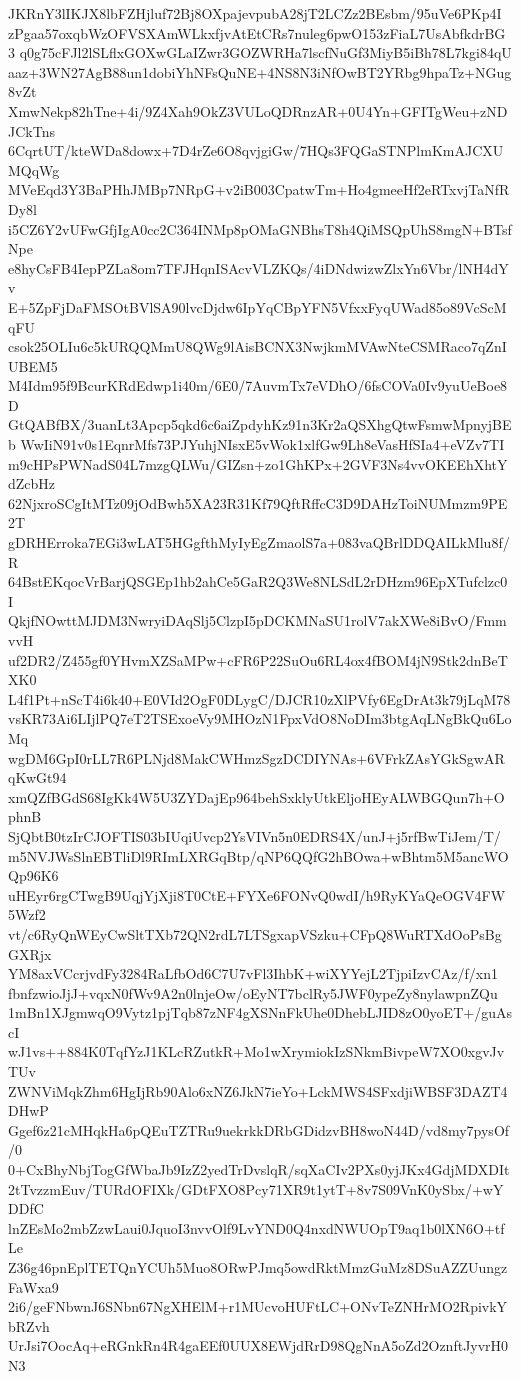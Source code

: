 JKRnY3lIKJX8lbFZHjluf72Bj8OXpajevpubA28jT2LCZz2BEsbm/95uVe6PKp4I
zPgaa57oxqbWzOFVSXAmWLkxfjvAtEtCRs7nuleg6pwO153zFiaL7UsAbfkdrBG3
q0g75cFJl2lSLflxGOXwGLaIZwr3GOZWRHa7lscfNuGf3MiyB5iBh78L7kgi84qU
aaz+3WN27AgB88un1dobiYhNFsQuNE+4NS8N3iNfOwBT2YRbg9hpaTz+NGug8vZt
XmwNekp82hTne+4i/9Z4Xah9OkZ3VULoQDRnzAR+0U4Yn+GFITgWeu+zNDJCkTns
6CqrtUT/kteWDa8dowx+7D4rZe6O8qvjgiGw/7HQs3FQGaSTNPlmKmAJCXUMQqWg
MVeEqd3Y3BaPHhJMBp7NRpG+v2iB003CpatwTm+Ho4gmeeHf2eRTxvjTaNfRDy8l
i5CZ6Y2vUFwGfjIgA0cc2C364INMp8pOMaGNBhsT8h4QiMSQpUhS8mgN+BTsfNpe
e8hyCsFB4IepPZLa8om7TFJHqnISAcvVLZKQs/4iDNdwizwZlxYn6Vbr/lNH4dYv
E+5ZpFjDaFMSOtBVlSA90lvcDjdw6IpYqCBpYFN5VfxxFyqUWad85o89VcScMqFU
csok25OLIu6c5kURQQMmU8QWg9lAisBCNX3NwjkmMVAwNteCSMRaco7qZnIUBEM5
M4Idm95f9BcurKRdEdwp1i40m/6E0/7AuvmTx7eVDhO/6fsCOVa0Iv9yuUeBoe8D
GtQABfBX/3uanLt3Apcp5qkd6c6aiZpdyhKz91n3Kr2aQSXhgQtwFsmwMpnyjBEb
WwIiN91v0s1EqnrMfs73PJYuhjNIsxE5vWok1xlfGw9Lh8eVasHfSIa4+eVZv7TI
m9cHPsPWNadS04L7mzgQLWu/GIZsn+zo1GhKPx+2GVF3Ns4vvOKEEhXhtYdZcbHz
62NjxroSCgItMTz09jOdBwh5XA23R31Kf79QftRffcC3D9DAHzToiNUMmzm9PE2T
gDRHErroka7EGi3wLAT5HGgfthMyIyEgZmaolS7a+083vaQBrlDDQAILkMlu8f/R
64BstEKqocVrBarjQSGEp1hb2ahCe5GaR2Q3We8NLSdL2rDHzm96EpXTufclzc0I
QkjfNOwttMJDM3NwryiDAqSlj5ClzpI5pDCKMNaSU1rolV7akXWe8iBvO/FmmvvH
uf2DR2/Z455gf0YHvmXZSaMPw+cFR6P22SuOu6RL4ox4fBOM4jN9Stk2dnBeTXK0
L4f1Pt+nScT4i6k40+E0VId2OgF0DLygC/DJCR10zXlPVfy6EgDrAt3k79jLqM78
vsKR73Ai6LIjlPQ7eT2TSExoeVy9MHOzN1FpxVdO8NoDIm3btgAqLNgBkQu6LoMq
wgDM6GpI0rLL7R6PLNjd8MakCWHmzSgzDCDIYNAs+6VFrkZAsYGkSgwARqKwGt94
xmQZfBGdS68IgKk4W5U3ZYDajEp964behSxklyUtkEljoHEyALWBGQun7h+OphnB
SjQbtB0tzIrCJOFTIS03bIUqiUvcp2YsVIVn5n0EDRS4X/unJ+j5rfBwTiJem/T/
m5NVJWsSlnEBTliDl9RImLXRGqBtp/qNP6QQfG2hBOwa+wBhtm5M5ancWOQp96K6
uHEyr6rgCTwgB9UqjYjXji8T0CtE+FYXe6FONvQ0wdI/h9RyKYaQeOGV4FW5Wzf2
vt/c6RyQnWEyCwSltTXb72QN2rdL7LTSgxapVSzku+CFpQ8WuRTXdOoPsBgGXRjx
YM8axVCcrjvdFy3284RaLfbOd6C7U7vFl3IhbK+wiXYYejL2TjpiIzvCAz/f/xn1
fbnfzwioJjJ+vqxN0fWv9A2n0lnjeOw/oEyNT7bclRy5JWF0ypeZy8nylawpnZQu
1mBn1XJgmwqO9Vytz1pjTqb87zNF4gXSNnFkUhe0DhebLJID8zO0yoET+/guAscI
wJ1vs++884K0TqfYzJ1KLcRZutkR+Mo1wXrymiokIzSNkmBivpeW7XO0xgvJvTUv
ZWNViMqkZhm6HgIjRb90Alo6xNZ6JkN7ieYo+LckMWS4SFxdjiWBSF3DAZT4DHwP
Ggef6z21cMHqkHa6pQEuTZTRu9uekrkkDRbGDidzvBH8woN44D/vd8my7pysOf/0
0+CxBhyNbjTogGfWbaJb9IzZ2yedTrDvslqR/sqXaCIv2PXs0yjJKx4GdjMDXDIt
2tTvzzmEuv/TURdOFIXk/GDtFXO8Pcy71XR9t1ytT+8v7S09VnK0ySbx/+wYDDfC
lnZEsMo2mbZzwLaui0JquoI3nvvOlf9LvYND0Q4nxdNWUOpT9aq1b0lXN6O+tfLe
Z36g46pnEplTETQnYCUh5Muo8ORwPJmq5owdRktMmzGuMz8DSuAZZUungzFaWxa9
2i6/geFNbwnJ6SNbn67NgXHElM+r1MUcvoHUFtLC+ONvTeZNHrMO2RpivkYbRZvh
UrJsi7OocAq+eRGnkRn4R4gaEEf0UUX8EWjdRrD98QgNnA5oZd2OznftJyvrH0N3
